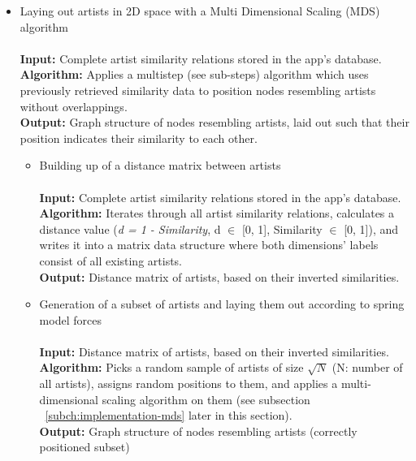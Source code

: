 \begin{itemize}
	\item Laying out artists in 2D space with a Multi Dimensional Scaling (MDS) algorithm \\\\
			\textbf{Input:} Complete artist similarity relations stored in the app's database.   \\
			\textbf{Algorithm:} Applies a multistep (see sub-steps) algorithm which uses previously
			retrieved similarity data to position nodes resembling artists without overlappings.  \\
			\textbf{Output:} Graph structure of nodes resembling artists, laid out such that their position 
			indicates their similarity to each other. \\
			
		\begin{itemize}
			
			\item Building up of a distance matrix between artists \\\\
				\textbf{Input:} Complete artist similarity relations stored in the app's database. \\
				\textbf{Algorithm:} Iterates through all artist similarity relations, calculates a
				distance value (\emph{d = 1 - Similarity}, d $\in$ [0, 1], Similarity $\in$ [0, 1]), and writes it into
				a matrix data structure where both dimensions' labels consist of all existing artists. \\
				\textbf{Output:} Distance matrix of artists, based on their inverted similarities. \\
				
			\item Generation of a subset of artists and laying them out according to spring model forces	\\\\
				\textbf{Input:} Distance matrix of artists, based on their inverted similarities. \\
				\textbf{Algorithm:} Picks a random sample of artists of size $\sqrt{N}$ (N: number of all artists), assigns random positions to them,
				and applies a multi-dimensional scaling algorithm on them (see subsection 
				~\ref{subch:implementation-mds} later in this section). \\
				\textbf{Output:} Graph structure of nodes resembling artists (correctly positioned subset) \\
				

\end{itemize}
\end{itemize}
